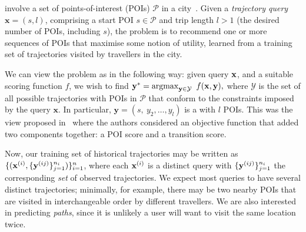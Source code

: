 {\trajrec} involve a set of points-of-interest (POIs) $\mathcal{P}$ 
in a city~\cite{bao2015recommendations,zheng2015trajectory,zheng2014urban}.
Given a \emph{trajectory query} $\mathbf{x} = (s, l)$,
comprising a start POI $s \in \mathcal{P}$ and trip length
$l \!>\! 1$ (\ie the desired number of POIs, including $s$),
the \emph{\trajrec} problem is to
recommend one or more sequences of POIs %
that maximise some notion of utility,
learned from a training set
of trajectories visited by travellers in the city.

We can view the {\trajrec} problem as {\seqrec} in the following way:
given {\trajectory} query $\mathbf{x}$, and a suitable scoring function $f$, we wish to find
$\mathbf{y}^* = \operatorname*{argmax}_{\mathbf{y} \in \mathcal{Y}}~f(\mathbf{x}, \mathbf{y}),$
where $\mathcal{Y}$ is the set of all possible trajectories with POIs in $\mathcal{P}$ that conform to the constraints imposed by the query $\mathbf{x}$.
In particular,
$\mathbf{y} = (s,~ y_2, \dots, y_l)$ is a {\trajectory} with $l$ POIs. %
This was the view proposed in~\cite{cikm16paper} where the authors considered an
objective function that added two components together: a POI score and a transition score.

Now, our training set of historical trajectories may be written as
$\{ ( \mathbf{x}^{({i})}, \{ \mathbf{y}^{({ij})} \}_{j=1}^{n_i} ) \}_{i=1}^{n}$,
where each $\mathbf{x}^{({i})}$ is a distinct query
with $\{ \mathbf{y}^{({ij})} \}_{j=1}^{n_i}$ the corresponding \emph{set} of observed trajectories.
We expect most queries to have several distinct trajectories;
minimally,
for example,
there may be two nearby POIs that are visited in interchangeable order by different travellers.
We are also interested in predicting \emph{paths}, %
since it is unlikely a user will want to visit the same location twice.


